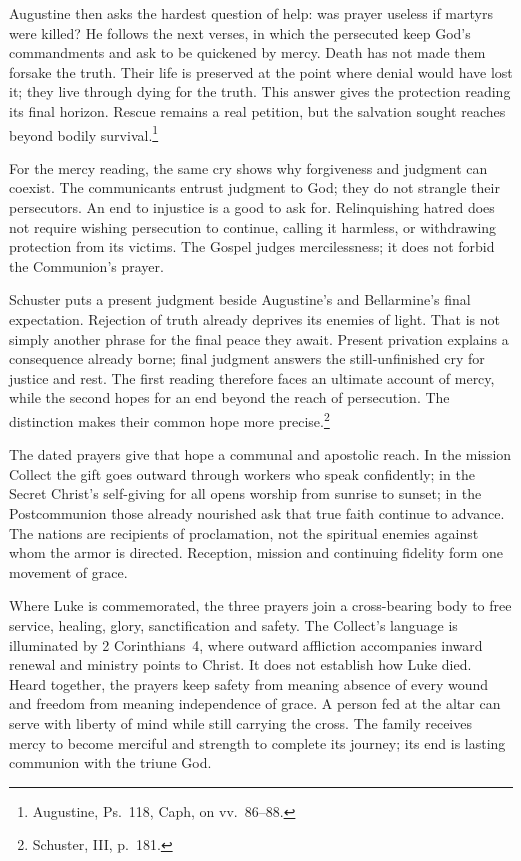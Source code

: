 Augustine then asks the hardest question of help: was prayer useless if martyrs were killed? He follows the next verses, in which the persecuted keep God's commandments and ask to be quickened by mercy. Death has not made them forsake the truth. Their life is preserved at the point where denial would have lost it; they live through dying for the truth. This answer gives the protection reading its final horizon. Rescue remains a real petition, but the salvation sought reaches beyond bodily survival.\footnote{Augustine, Ps.~118, Caph, on vv.~86--88.}

For the mercy reading, the same cry shows why forgiveness and judgment can coexist. The communicants entrust judgment to God; they do not strangle their persecutors. An end to injustice is a good to ask for. Relinquishing hatred does not require wishing persecution to continue, calling it harmless, or withdrawing protection from its victims. The Gospel judges mercilessness; it does not forbid the Communion's prayer.

Schuster puts a present judgment beside Augustine's and Bellarmine's final expectation. Rejection of truth already deprives its enemies of light. That is not simply another phrase for the final peace they await. Present privation explains a consequence already borne; final judgment answers the still-unfinished cry for justice and rest. The first reading therefore faces an ultimate account of mercy, while the second hopes for an end beyond the reach of persecution. The distinction makes their common hope more precise.\footnote{Schuster, III, p.~181.}

The dated prayers give that hope a communal and apostolic reach. In the mission Collect the gift goes outward through workers who speak confidently; in the Secret Christ's self-giving for all opens worship from sunrise to sunset; in the Postcommunion those already nourished ask that true faith continue to advance. The nations are recipients of proclamation, not the spiritual enemies against whom the armor is directed. Reception, mission and continuing fidelity form one movement of grace.

Where Luke is commemorated, the three prayers join a cross-bearing body to free service, healing, glory, sanctification and safety. The Collect's language is illuminated by 2 Corinthians~4, where outward affliction accompanies inward renewal and ministry points to Christ. It does not establish how Luke died. Heard together, the prayers keep safety from meaning absence of every wound and freedom from meaning independence of grace. A person fed at the altar can serve with liberty of mind while still carrying the cross. The family receives mercy to become merciful and strength to complete its journey; its end is lasting communion with the triune God.
